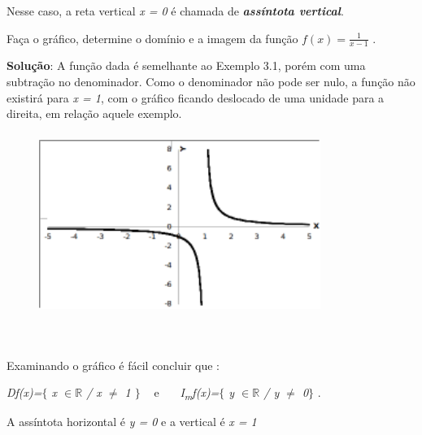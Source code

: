 Nesse caso, a reta vertical \textit{x = 0} é chamada de \textbf{\textit{assíntota vertical}}.

\begin{texemplo}
Faça o gráfico, determine o domínio e a imagem da função  \( f \left( x \right) =\frac{1}{x-1} \) .

\textbf{Solução}: A função dada é semelhante ao Exemplo 3.1, porém com uma subtração no denominador. Como o denominador não pode ser nulo, a função não existirá para \textit{x = 1}, com o gráfico ficando deslocado de uma unidade para a direita, em relação aquele exemplo.

\begin{figure}[H]
	\begin{Center}
		\includegraphics[width=3.6in,height=2.33in]{capitulos/outras_funcoes/media/image11.pdf}
	\end{Center}
\end{figure}

~~

\quad Examinando o gráfico é fácil concluir que : 

\textit{Df(x)=$ \{ $  x $ \in \mathbb{R} $  \textbf{ }/ x $ \neq $  1\textbf{ }$ \} $ ~ } \quad e~~~  \textit{I\textsubscript{m}f(x)=$ \{ $ y $ \in \mathbb{R}$   / y $ \neq $  0$ \} $  }. 

A assíntota horizontal é \textit{y = 0} e a vertical é \textit{x = 1}~~ \qedsymbol{} 
\end{texemplo}

